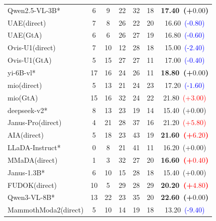 \documentclass{article}
\theoremstyle{plain}
\theoremstyle{definition}
\theoremstyle{remark}
\begin{document}
\begin{table}[!htbp]
{\begin{tabular}{@{}lcccccc@{}}
\midrule

\rowcolor{gray!12}
Qwen2.5-VL-3B* & 6 & 9 & 22 & 32 & 18 & \textbf{17.40~(+$0.00$)} \\
UAE(direct) & 7 & 8 & 26 & 22 & 20 & 16.60~\textcolor{blue}{(-$0.80$)} \\
UAE(GtA) & 6 & 6 & 26 & 27 & 19 & 16.80~\textcolor{blue}{(-$0.60$)} \\
Ovis-U1(direct) & 7 & 10 & 12 & 28 & 18 & 15.00~\textcolor{blue}{(-$2.40$)} \\
Ovis-U1(GtA) & 5 & 15 & 27 & 27 & 11 & 17.00~\textcolor{blue}{(-$0.40$)} \\

\midrule

\rowcolor{gray!12}
yi-6B-vl* & 17 & 16 & 24 & 26 & 11 & \textbf{18.80~(+$0.00$)} \\
mio(direct) & 5 & 13 & 21 & 24 & 23 & 17.20~\textcolor{blue}{(-$1.60$)} \\
mio(GtA) & 15 & 16 & 32 & 24 & 22 & 21.80~\textcolor{red}{(+$3.00$)} \\

\midrule

\rowcolor{gray!12}
deepseek-v2* & 8 & 13 & 23 & 19 & 14 & 15.40~(+$0.00$) \\
Janus-Pro(direct) & 4 & 21 & 28 & 37 & 16 & 21.20~\textcolor{red}{(+$5.80$)} \\
AIA(direct) & 5 & 18 & 23 & 43 & 19 & \textbf{21.60~\textcolor{red}{(+$6.20$)}} \\

\midrule

\rowcolor{gray!12}
LLaDA-Instruct* & 0 & 8 & 21 & 41 & 11 & 16.20~(+$0.00$) \\
MMaDA(direct) & 1 & 3 & 32 & 27 & 20 & \textbf{16.60~\textcolor{red}{(+$0.40$)}} \\

\midrule

\rowcolor{gray!12}
Janus-1.3B* & 6 & 10 & 15 & 28 & 18 & 15.40~(+$0.00$) \\
FUDOK(direct) & 10 & 5 & 29 & 28 & 29 & \textbf{20.20~\textcolor{red}{(+$4.80$)}} \\

\midrule

\rowcolor{gray!12}
Qwen3-VL-8B* & 13 & 22 & 23 & 35 & 20 & \textbf{22.60~(+$0.00$)} \\
MammothModa2(direct) & 5 & 10 & 14 & 19 & 18 & 13.20~\textcolor{blue}{(-$9.40$)} \\


\end{tabular}}
\end{table}
\end{document}
